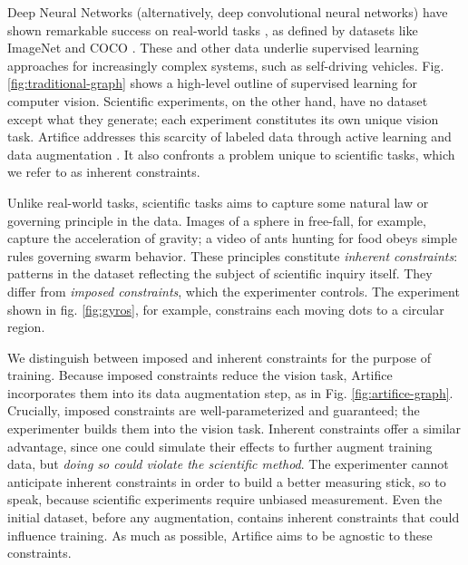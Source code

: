 \documentclass[twocolumn, 10pt]{asme2ej} %
\begin{document}
Deep Neural Networks (alternatively, deep convolutional neural networks) have
shown remarkable success on real-world tasks \cite{krizhevsky_imagenet_2012}, as
defined by datasets like ImageNet \cite{deng_imagenet:_nodate} and COCO
\cite{lin_microsoft_2014}. These and other data underlie supervised learning
approaches for increasingly complex systems, such as self-driving
vehicles. Fig. \ref{fig:traditional-graph} shows a high-level outline of
supervised learning for computer vision. Scientific experiments, on the other
hand, have no dataset except what they generate; each experiment constitutes its
own unique vision task. Artifice addresses this scarcity of labeled data through
active learning \cite{settles_active_2012, kao_localization-aware_2018,
  jain_active_2016} and data augmentation \cite{krizhevsky_imagenet_2012,
  ronneberger_u-net:_2015}. It also confronts a problem unique to scientific
tasks, which we refer to as inherent constraints.

Unlike real-world tasks, scientific tasks aims to capture some natural law or
governing principle in the data. Images of a sphere in free-fall, for example,
capture the acceleration of gravity; a video of ants hunting for food obeys
simple rules governing swarm behavior. These principles constitute
\emph{inherent constraints}: patterns in the dataset reflecting the subject of
scientific inquiry itself. They differ from \emph{imposed constraints}, which
the experimenter controls. The experiment shown in fig. \ref{fig:gyros}, for
example, constrains each moving dots to a circular region.

We distinguish between imposed and inherent constraints for the purpose of
training. Because imposed constraints reduce the vision task, Artifice
incorporates them into its data augmentation step, as in
Fig. \ref{fig:artifice-graph}. Crucially, imposed constraints are
well-parameterized and guaranteed; the experimenter builds them into the vision
task. Inherent constraints offer a similar advantage, since one could simulate
their effects to further augment training data, but \emph{doing so could violate
  the scientific method}. The experimenter cannot anticipate inherent
constraints in order to build a better measuring stick, so to speak, because
scientific experiments require unbiased measurement. Even the initial dataset,
before any augmentation, contains inherent constraints that could influence
training. As much as possible, Artifice aims to be agnostic to these constraints.
\end{document}
